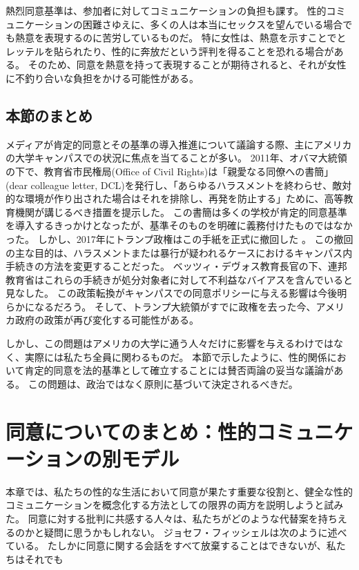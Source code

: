 \documentclass[paper=a4,book,openany]{jlreq}
\newcommand{\ig}[1]{}           %
\begin{document}
熱烈同意基準は、参加者に対してコミュニケーションの負担も課す。
性的コミュニケーションの困難さゆえに、多くの人は本当にセックスを望んでいる場合でも熱意を表現するのに苦労しているものだ。
特に女性は、熱意を示すことでとレッテルを貼られたり、性的に奔放だという評判を得ることを恐れる場合がある。
そのため、同意を熱意を持って表現することが期待されると、それが女性に不釣り合いな負担をかける可能性がある。

\subsection{本節のまとめ}

メディアが肯定的同意とその基準の導入推進について議論する際、主にアメリカの大学キャンパスでの状況に焦点を当てることが多い。
2011年、オバマ大統領の下で、教育省市民権局(Office of Civil Rights)は「親愛なる同僚への書簡」(dear colleague letter, DCL)を発行し、「あらゆるハラスメントを終わらせ、敵対的な環境が作り出された場合はそれを排除し、再発を防止する」ために、高等教育機関が講じるべき措置を提示した。
この書簡は多くの学校が肯定的同意基準を導入するきっかけとなったが、基準そのものを明確に義務付けたものではなかった。
しかし、2017年にトランプ政権はこの手紙を正式に撤回した
\citep{melnick20:_analy_depar_educat_final_title}。
この撤回の主な目的は、ハラスメントまたは暴行が疑われるケースにおけるキャンパス内手続きの方法を変更することだった。
ベッツィ・デヴォス\ig{Betsy DeVos}教育長官の下、連邦教育省はこれらの手続きが処分対象者に対して不利益なバイアスを含んでいると見なした。
この政策転換がキャンパスでの同意ポリシーに与える影響は今後明らかになるだろう。
そして、トランプ大統領がすでに政権を去った今、アメリカ政府の政策が再び変化する可能性がある。

しかし、この問題はアメリカの大学に通う人々だけに影響を与えるわけではなく、実際には私たち全員に関わるものだ。
本節で示したように、性的関係において肯定的同意を法的基準として確立することには賛否両論の妥当な議論がある。
この問題は、政治ではなく原則に基づいて決定されるべきだ。

\section{同意についてのまとめ：性的コミュニケーションの別モデル}

本章では、私たちの性的な生活において同意が果たす重要な役割と、健全な性的コミュニケーションを概念化する方法としての限界の両方を説明しようと試みた。
同意に対する批判に共感する人々は、私たちがどのような代替案を持ちえるのかと疑問に思うかもしれない。
ジョセフ・フィッシェル\ig{Joseph Fischel}は次のように述べている。
たしかに同意に関する会話をすべて放棄することはできないが、私たちはそれでも
\end{document}
